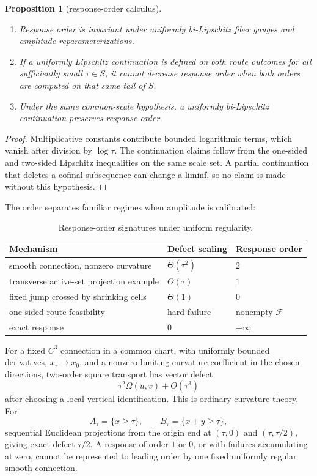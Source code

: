 \documentclass[11pt]{article}
\newtheorem{proposition}[theorem]{Proposition}
\theoremstyle{definition}
\theoremstyle{remark}
\begin{document}
\begin{proposition}[response-order calculus]
\label{prop:order}
\begin{enumerate}
\item Response order is invariant under uniformly bi-Lipschitz fiber gauges
and amplitude reparameterizations.
\item If a uniformly Lipschitz continuation is defined on both route outcomes
for all sufficiently small \(\tau\in S\), it cannot decrease response order
when both orders are computed on that same tail of \(S\).
\item Under the same common-scale hypothesis, a uniformly bi-Lipschitz
continuation preserves response order.
\end{enumerate}
\end{proposition}

\begin{proof}
Multiplicative constants contribute bounded logarithmic terms, which vanish
after division by \(\log\tau\). The continuation claims follow from the
one-sided and two-sided Lipschitz inequalities on the same scale set. A
partial continuation that deletes a cofinal subsequence can change a liminf,
so no claim is made without this hypothesis.
\end{proof}

The order separates familiar regimes when amplitude is calibrated:

\begin{table}[ht]
\centering
\caption{Response-order signatures under uniform regularity.}
\label{tab:orders}
\begin{tabular}{lll}
\toprule
Mechanism & Defect scaling & Response order \\
\midrule
smooth connection, nonzero curvature & \(\Theta(\tau^2)\) & \(2\) \\
transverse active-set projection example & \(\Theta(\tau)\) & \(1\) \\
fixed jump crossed by shrinking cells & \(\Theta(1)\) & \(0\) \\
one-sided route feasibility & hard failure & nonempty \(\mathcal F\) \\
exact response & \(0\) & \(+\infty\) \\
\bottomrule
\end{tabular}
\end{table}

For a fixed \(C^3\) connection in a common chart, with uniformly bounded
derivatives, \(x_\tau\to x_0\), and a nonzero limiting curvature coefficient
in the chosen directions, two-order square transport has vector defect
\[
\tau^2\Omega(u,v)+O(\tau^3)
\]
after choosing a local vertical identification. This is ordinary curvature
theory. For
\[
A_\tau=\{x\ge\tau\},\qquad
B_\tau=\{x+y\ge\tau\},
\]
sequential Euclidean projections from the origin end at
\((\tau,0)\) and \((\tau,\tau/2)\), giving exact defect
\(\tau/2\). A response of order \(1\) or \(0\), or with failures accumulating
at zero, cannot be represented to leading order by one fixed uniformly
regular smooth connection.
\end{document}
